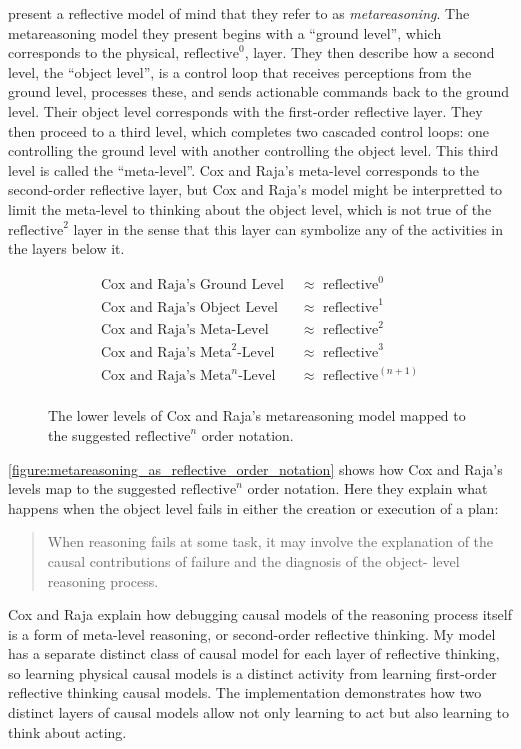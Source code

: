\cite{cox_and_raja:2008} present a reflective model of mind that they
refer to as \emph{metareasoning}.  The metareasoning model they
present begins with a ``ground level'', which corresponds to the
physical, $\text{reflective}^0$, layer.  They then describe how a
second level, the ``object level'', is a control loop that receives
perceptions from the ground level, processes these, and sends
actionable commands back to the ground level.  Their object level
corresponds with the first-order reflective layer.  They then proceed
to a third level, which completes two cascaded control loops: one
controlling the ground level with another controlling the object
level.  This third level is called the ``meta-level''.  Cox and Raja's
meta-level corresponds to the second-order reflective layer, but Cox
and Raja's model might be interpretted to limit the meta-level to
thinking about the object level, which is not true of the
$\text{reflective}^2$ layer in the sense that this layer can symbolize
any of the activities in the layers below it.
\begin{figure}[bth]
\begin{align*}
\text{Cox and Raja's Ground Level } &{\approx} \text{ reflective}^0 \\
\text{Cox and Raja's Object Level } &{\approx} \text{ reflective}^1 \\
\text{Cox and Raja's Meta-Level }   &{\approx} \text{ reflective}^2 \\
\text{Cox and Raja's $\text{Meta}^2$-Level } &{\approx} \text{ reflective}^3 \\
\text{Cox and Raja's $\text{Meta}^n$-Level } &{\approx} \text{ reflective}^{(n+1)} \\
\end{align*}
\caption{The lower levels of Cox and Raja's metareasoning model mapped
  to the suggested $\text{reflective}^n$ order notation.}
\label{figure:metareasoning_as_reflective_order_notation}
\end{figure}
\autoref{figure:metareasoning_as_reflective_order_notation} shows how
Cox and Raja's levels map to the suggested $\text{reflective}^n$ order
notation.  Here they explain what happens when the object level fails
in either the creation or execution of a plan:
\begin{quote}
When reasoning fails at some task, it may involve the explanation of
the causal contributions of failure and the diagnosis of the object-
level reasoning process.
\end{quote}
Cox and Raja explain how debugging causal models of the reasoning
process itself is a form of meta-level reasoning, or second-order
reflective thinking.  My model has a separate distinct class of causal
model for each layer of reflective thinking, so learning physical
causal models is a distinct activity from learning first-order
reflective thinking causal models.  The implementation demonstrates
how two distinct layers of causal models allow not only learning to
act but also learning to think about acting.

